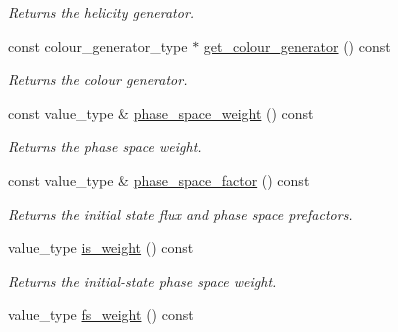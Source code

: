 \begin{DoxyCompactItemize}
\begin{DoxyCompactList}\small\item\em Returns the helicity generator. \end{DoxyCompactList}\item 
\hypertarget{a00430_a864a7a868bda19ea34cb42751fd716ca}{const colour\-\_\-generator\-\_\-type $\ast$ \hyperlink{a00430_a864a7a868bda19ea34cb42751fd716ca}{get\-\_\-colour\-\_\-generator} () const }\label{a00430_a864a7a868bda19ea34cb42751fd716ca}

\begin{DoxyCompactList}\small\item\em Returns the colour generator. \end{DoxyCompactList}\item 
\hypertarget{a00430_a39fb72cd0e8adca6c6a923a21a64c3c8}{const value\-\_\-type \& \hyperlink{a00430_a39fb72cd0e8adca6c6a923a21a64c3c8}{phase\-\_\-space\-\_\-weight} () const }\label{a00430_a39fb72cd0e8adca6c6a923a21a64c3c8}

\begin{DoxyCompactList}\small\item\em Returns the phase space weight. \end{DoxyCompactList}\item 
\hypertarget{a00430_a855d1f8106314b6956fdbf91e90b7d26}{const value\-\_\-type \& \hyperlink{a00430_a855d1f8106314b6956fdbf91e90b7d26}{phase\-\_\-space\-\_\-factor} () const }\label{a00430_a855d1f8106314b6956fdbf91e90b7d26}

\begin{DoxyCompactList}\small\item\em Returns the initial state flux and phase space prefactors. \end{DoxyCompactList}\item 
\hypertarget{a00430_acb573ed675785481c7aa8561a29f15bf}{value\-\_\-type \hyperlink{a00430_acb573ed675785481c7aa8561a29f15bf}{is\-\_\-weight} () const }\label{a00430_acb573ed675785481c7aa8561a29f15bf}

\begin{DoxyCompactList}\small\item\em Returns the initial-\/state phase space weight. \end{DoxyCompactList}\item 
\hypertarget{a00430_a0d59496a47e5def88b57407636c901b2}{value\-\_\-type \hyperlink{a00430_a0d59496a47e5def88b57407636c901b2}{fs\-\_\-weight} () const }\label{a00430_a0d59496a47e5def88b57407636c901b2}


\end{DoxyCompactItemize}
